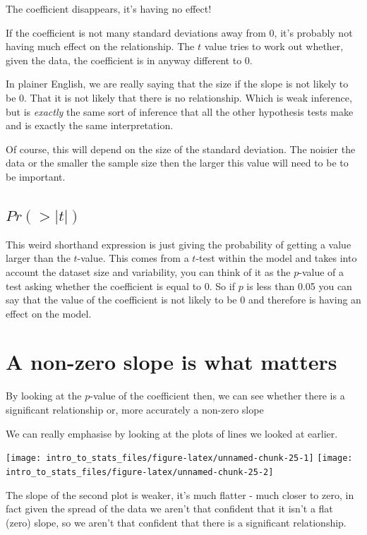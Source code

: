 \documentclass[
]{book}
\begin{document}
The coefficient disappears, it's having no effect!

If the coefficient is not many standard deviations away from 0, it's probably not having much effect on the relationship. The \(t\) value tries to work out whether, given the data, the coefficient is in anyway different to 0.

In plainer English, we are really saying that the size if the slope is not likely to be 0. That it is not likely that there is no relationship. Which is weak inference, but is \emph{exactly} the same sort of inference that all the other hypothesis tests make and is exactly the same interpretation.

Of course, this will depend on the size of the standard deviation. The noisier the data or the smaller the sample size then the larger this value will need to be to be important.

\hypertarget{prt}{%
\subsection{\texorpdfstring{\(Pr(>|t|)\)}{Pr(\textgreater\textbar t\textbar)}}\label{prt}}

This weird shorthand expression is just giving the probability of getting a value larger than the \(t\)-value. This comes from a \(t\)-test within the model and takes into account the dataset size and variability, you can think of it as the \(p\)-value of a test asking whether the coefficient is equal to 0. So if \(p\) is less than 0.05 you can say that the value of the coefficient is not likely to be 0 and therefore is having an effect on the model.

\hypertarget{a-non-zero-slope-is-what-matters}{%
\section{A non-zero slope is what matters}\label{a-non-zero-slope-is-what-matters}}

By looking at the \(p\)-value of the coefficient then, we can see whether there is a significant relationship or, more accurately a non-zero slope

We can really emphasise by looking at the plots of lines we looked at earlier.

\texttt{[image: intro\_to\_stats\_files/figure-latex/unnamed-chunk-25-1]} \texttt{[image: intro\_to\_stats\_files/figure-latex/unnamed-chunk-25-2]}

The slope of the second plot is weaker, it's much flatter - much closer to zero, in fact given the spread of the data we aren't that confident that it isn't a flat (zero) slope, so we aren't that confident that there is a significant relationship.
\end{document}
